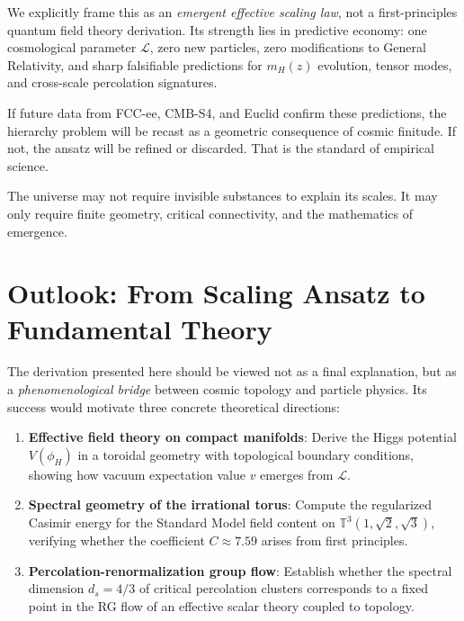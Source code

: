 \documentclass[11pt,a4paper]{article}
\newcommand{\Ltop}{\ensuremath{\mathcal{L}}}
\begin{document}
We explicitly frame this as an \textit{emergent effective scaling law}, not a 
first-principles quantum field theory derivation. Its strength lies in predictive 
economy: one cosmological parameter $\Ltop$, zero new particles, zero modifications 
to General Relativity, and sharp falsifiable predictions for $m_H(z)$ evolution, 
tensor modes, and cross-scale percolation signatures.

If future data from FCC-ee, CMB-S4, and Euclid confirm these predictions, the 
hierarchy problem will be recast as a geometric consequence of cosmic finitude. 
If not, the ansatz will be refined or discarded. That is the standard of 
empirical science.

The universe may not require invisible substances to explain its scales. It may 
only require finite geometry, critical connectivity, and the mathematics of emergence.

\section*{Outlook: From Scaling Ansatz to Fundamental Theory}

The derivation presented here should be viewed not as a final explanation, but as 
a \textit{phenomenological bridge} between cosmic topology and particle physics. 
Its success would motivate three concrete theoretical directions:

\begin{enumerate}
    \item \textbf{Effective field theory on compact manifolds}: Derive the 
    Higgs potential $V(\phi_H)$ in a toroidal geometry with topological boundary 
    conditions, showing how vacuum expectation value $v$ emerges from $\Ltop$.
    
    \item \textbf{Spectral geometry of the irrational torus}: Compute the 
    regularized Casimir energy for the Standard Model field content on 
    $\mathbb{T}^3(1,\sqrt{2},\sqrt{3})$, verifying whether the coefficient 
    $C \approx 7.59$ arises from first principles.
    
    \item \textbf{Percolation-renormalization group flow}: Establish whether 
    the spectral dimension $d_s = 4/3$ of critical percolation clusters 
    corresponds to a fixed point in the RG flow of an effective scalar theory 
    coupled to topology.
\end{enumerate}
\end{document}
